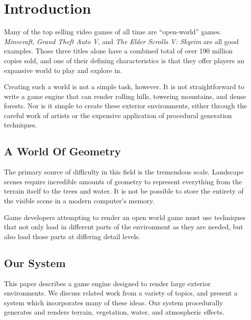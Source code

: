 
\chapter{Introduction}


Many of the top selling video games of all time are ``open-world'' games.
{\em Minecraft}, {\em Grand Theft Auto V}, and {\em The Elder Scrolls V: Skyrim} are all good examples.
Those three titles alone have a combined total of over 190 million copies sold, and one of their defining characteristics is that they offer players an expansive world to play and explore in.

Creating such a world is not a simple task, however.
It is not straightforward to write a game engine that can render rolling hills, towering mountains, and dense forests.
Nor is it simple to create these exterior environments, either through the careful work of artists or the expensive application of procedural generation techniques.


\section{A World Of Geometry}

The primary source of difficulty in this field is the tremendous scale.
Landscape scenes require incredible amounts of geometry to represent everything from the terrain itself to the trees and water.
It is not be possible to store the entirety of the visible scene in a modern computer's memory.

Game developers attempting to render an open world game must use techniques that not only load in different parts of the environment as they are needed, but also load those parts at differing detail levels.


\section{Our System}


This paper describes a game engine designed to render large exterior environments.
We discuss related work from a variety of topics, and present a system which incorporates many of these ideas.
Our system procedurally generates and renders terrain, vegetation, water, and atmospheric effects.
